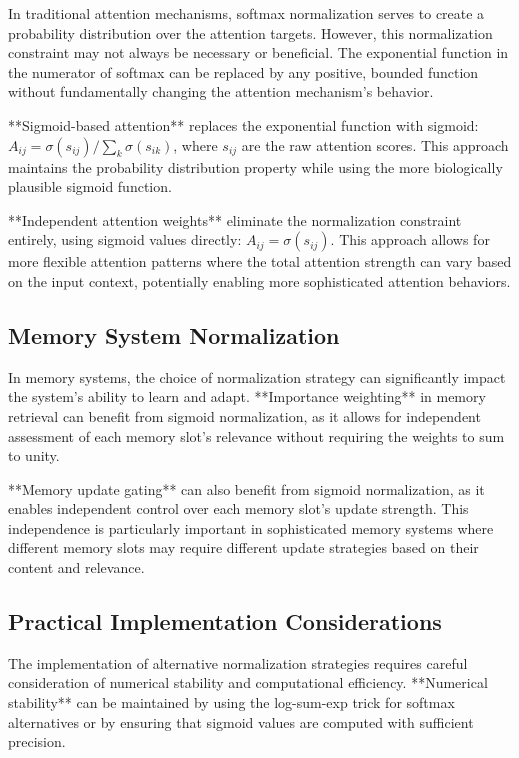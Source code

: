 \documentclass{article}
\begin{document}
In traditional attention mechanisms, softmax normalization serves to create a probability distribution over the attention targets. However, this normalization constraint may not always be necessary or beneficial. The exponential function in the numerator of softmax can be replaced by any positive, bounded function without fundamentally changing the attention mechanism's behavior.

**Sigmoid-based attention** replaces the exponential function with sigmoid: $A_{ij} = \sigma(s_{ij}) / \sum_k \sigma(s_{ik})$, where $s_{ij}$ are the raw attention scores. This approach maintains the probability distribution property while using the more biologically plausible sigmoid function.

**Independent attention weights** eliminate the normalization constraint entirely, using sigmoid values directly: $A_{ij} = \sigma(s_{ij})$. This approach allows for more flexible attention patterns where the total attention strength can vary based on the input context, potentially enabling more sophisticated attention behaviors.

\subsection{Memory System Normalization}

In memory systems, the choice of normalization strategy can significantly impact the system's ability to learn and adapt. **Importance weighting** in memory retrieval can benefit from sigmoid normalization, as it allows for independent assessment of each memory slot's relevance without requiring the weights to sum to unity.

**Memory update gating** can also benefit from sigmoid normalization, as it enables independent control over each memory slot's update strength. This independence is particularly important in sophisticated memory systems where different memory slots may require different update strategies based on their content and relevance.

\subsection{Practical Implementation Considerations}

The implementation of alternative normalization strategies requires careful consideration of numerical stability and computational efficiency. **Numerical stability** can be maintained by using the log-sum-exp trick for softmax alternatives or by ensuring that sigmoid values are computed with sufficient precision.
\end{document}
